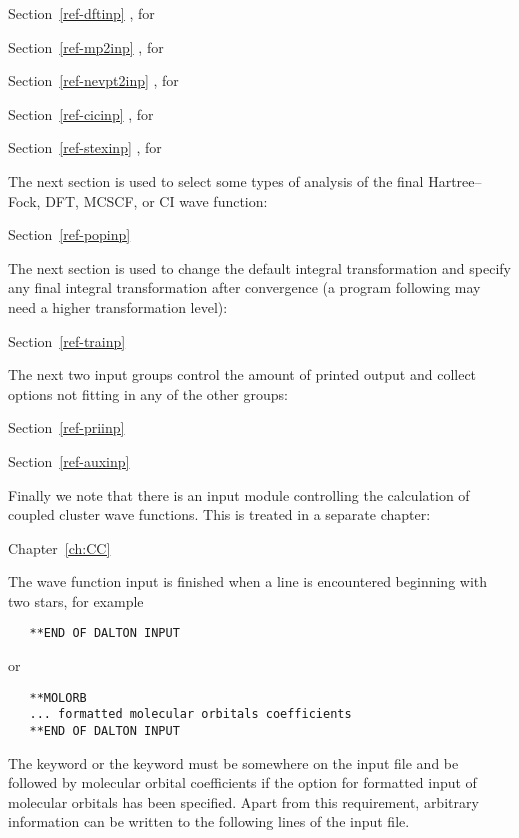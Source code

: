 Section~\ref{ref-dftinp} , for 

Section~\ref{ref-mp2inp} , for 

Section~\ref{ref-nevpt2inp} , for 

Section~\ref{ref-cicinp} , for 

Section~\ref{ref-stexinp} , for 

\noindent
The next section is used to select some types of analysis of the final
Hartree--Fock, DFT, MCSCF, or CI wave function:

Section~\ref{ref-popinp} 

\noindent
The next section is used to change the default integral transformation
and specify any final integral transformation after convergence (a
program following {\sir} may need a higher transformation level):

Section~\ref{ref-trainp} 

\noindent
The next two input groups control the amount of printed output and
collect options not fitting in any of the other groups:

Section~\ref{ref-priinp} 

Section~\ref{ref-auxinp} 

\noindent
Finally we note that there is an input module controlling the
calculation of coupled cluster wave functions. This is treated in a
separate chapter:

Chapter~\ref{ch:CC} 

\bigskip
\noindent
The wave function input is finished when a line is encountered beginning
with two stars, for example

\begin{inputex} \begin{verbatim}
   **END OF DALTON INPUT
\end{verbatim} \end{inputex}
or

\begin{inputex} \begin{verbatim}
   **MOLORB
   ... formatted molecular orbitals coefficients
   **END OF DALTON INPUT
\end{verbatim} \end{inputex}

\noindent
The  keyword or the  keyword
must be somewhere on the input file and be
followed by molecular orbital coefficients if the option for formatted
input of molecular orbitals has been specified.  Apart from this
requirement, arbitrary information can be written to the following lines
of the input file.



